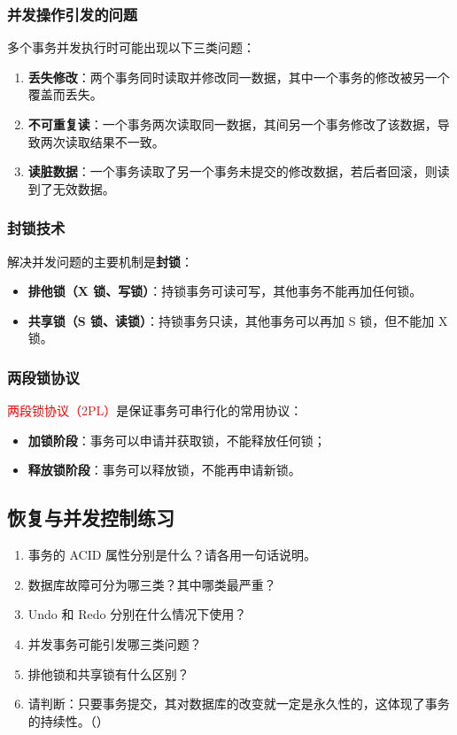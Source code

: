 \documentclass{../../note}
\begin{document}
\subsubsection{并发操作引发的问题}

多个事务并发执行时可能出现以下三类问题：

\begin{enumerate}
  \item \textbf{丢失修改}：两个事务同时读取并修改同一数据，其中一个事务的修改被另一个覆盖而丢失。
  \item \textbf{不可重复读}：一个事务两次读取同一数据，其间另一个事务修改了该数据，导致两次读取结果不一致。
  \item \textbf{读脏数据}：一个事务读取了另一个事务未提交的修改数据，若后者回滚，则读到了无效数据。
\end{enumerate}

\subsubsection{封锁技术}

解决并发问题的主要机制是\textbf{封锁}：

\begin{itemize}
  \item \textbf{排他锁（X 锁、写锁）}：持锁事务可读可写，其他事务不能再加任何锁。
  \item \textbf{共享锁（S 锁、读锁）}：持锁事务只读，其他事务可以再加 S 锁，但不能加 X 锁。
\end{itemize}

\subsubsection{两段锁协议}

\textcolor{red}{两段锁协议（2PL）}是保证事务可串行化的常用协议：

\begin{itemize}
  \item \textbf{加锁阶段}：事务可以申请并获取锁，不能释放任何锁；
  \item \textbf{释放锁阶段}：事务可以释放锁，不能再申请新锁。
\end{itemize}

\subsection{恢复与并发控制练习}

\begin{enumerate}
  \item 事务的 ACID 属性分别是什么？请各用一句话说明。
  \item 数据库故障可分为哪三类？其中哪类最严重？
  \item Undo 和 Redo 分别在什么情况下使用？
  \item 并发事务可能引发哪三类问题？
  \item 排他锁和共享锁有什么区别？
  \item 请判断：只要事务提交，其对数据库的改变就一定是永久性的，这体现了事务的持续性。（\hspace{1cm}）
\end{enumerate}
\end{document}
